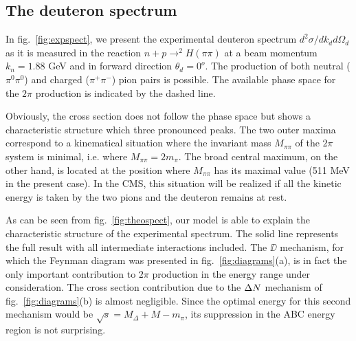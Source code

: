 \subsection{The deuteron spectrum}
\label{sec:spectrum}

In fig.\ \ref{fig:expspect}, we present the experimental deuteron spectrum 
$d^2 \sigma / dk_d d\Omega_d$ as it is measured in the reaction 
$n+p \rightarrow ^2H (\pi \pi)$ at a beam momentum $k_n = 1.88$ GeV and 
in forward direction $\theta_d = 0^o$. 
The production of both neutral ($\pi^0 \pi^0$) and charged ($\pi^+ \pi^-$) 
pion pairs is possible. The available phase space for the $2\pi$
production is indicated by the dashed line. 

Obviously, the cross section does not follow the phase space but
shows a characteristic structure which three pronounced peaks.
The two outer maxima correspond to a kinematical situation
where the invariant mass $M_{\pi\pi}$ of the $2\pi$ system is minimal,
i.e. where $M_{\pi\pi} = 2 m_\pi$. The broad central maximum, on the other hand,
is located at the  position where $M_{\pi \pi}$ has its maximal 
value (511 MeV in the present case). In the CMS, this situation will 
be realized if all the kinetic energy is taken by the two pions 
and the deuteron remains at rest.

As can be seen from fig.\ \ref{fig:theospect}, our model is able to 
explain the characteristic structure of the experimental spectrum. 
The solid line represents the full result with
all intermediate interactions included. The $\DD$ mechanism, for which
the Feynman diagram was presented in fig.\ \ref{fig:diagrams}(a), is in fact
the only important contribution to $2\pi$ production in the energy range under
consideration. The cross section contribution due to the ${\Delta N}$ mechanism
of fig.\ \ref{fig:diagrams}(b) is almost negligible. Since the optimal energy
for this second mechanism would be $\sqrt{s} = M_\Delta + M - m_\pi$,
its suppression in the ABC energy region is not surprising.

